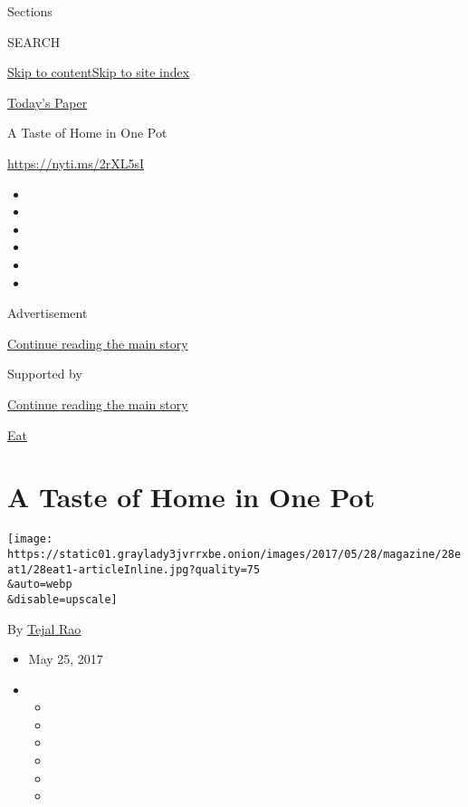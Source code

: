 Sections

SEARCH

\protect\hyperlink{site-content}{Skip to
content}\protect\hyperlink{site-index}{Skip to site index}

\href{https://myaccount.nytimes3xbfgragh.onion/auth/login?response_type=cookie\&client_id=vi}{}

\href{https://www.nytimes3xbfgragh.onion/section/todayspaper}{Today's
Paper}

A Taste of Home in One Pot

\url{https://nyti.ms/2rXL5sI}

\begin{itemize}
\item
\item
\item
\item
\item
\item
\end{itemize}

Advertisement

\protect\hyperlink{after-top}{Continue reading the main story}

Supported by

\protect\hyperlink{after-sponsor}{Continue reading the main story}

\href{/column/magazine-eat}{Eat}

\hypertarget{a-taste-of-home-in-one-pot}{%
\section{A Taste of Home in One Pot}\label{a-taste-of-home-in-one-pot}}

\texttt{[image: https://static01.graylady3jvrrxbe.onion/images/2017/05/28/magazine/28eat1/28eat1-articleInline.jpg?quality=75\\\&auto=webp\\\&disable=upscale]}

By \href{https://www.nytimes3xbfgragh.onion/by/tejal-rao}{Tejal Rao}

\begin{itemize}
\item
  May 25, 2017
\item
  \begin{itemize}
  \item
  \item
  \item
  \item
  \item
  \item
  \end{itemize}
\end{itemize}

